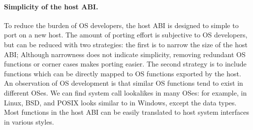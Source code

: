\paragraph{Simplicity of the host ABI.}
To reduce the burden of OS developers, the host ABI is designed to simple to port on a new host.
The amount of porting effort is subjective to OS developers,
but can be reduced with two strategies:
the first is to narrow the size of the host ABI;
Although narrowness does not indicate simplicity, removing redundant OS functions or corner cases
makes porting easier.
The second strategy is to include functions which can be directly mapped to OS functions exported by the host.
An observation of OS development is that
similar OS functions tend to exist in different OSes.
We can find system call lookalikes in many OSes: for example,  in Linux, BSD, and POSIX
looks similar to  in Windows, except the data types.
Most functions in the host ABI can be easily translated to host system interfaces
in various styles.







